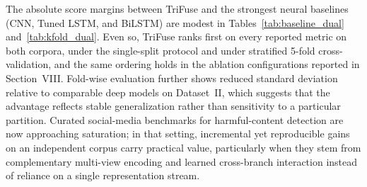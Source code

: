 \begin{table}[!t]
\caption{Stratified 5-Fold Cross-Validation Results (mean\,$\pm$\,std)}
\label{tab:kfold_dual}
\centering
{}
\end{table}

The absolute score margins between TriFuse and the strongest neural baselines (CNN, Tuned LSTM, and BiLSTM) are modest in Tables~\ref{tab:baseline_dual} and~\ref{tab:kfold_dual}. Even so, TriFuse ranks first on every reported metric on both corpora, under the single-split protocol and under stratified 5-fold cross-validation, and the same ordering holds in the ablation configurations reported in Section~VIII. Fold-wise evaluation further shows reduced standard deviation relative to comparable deep models on Dataset~II, which suggests that the advantage reflects stable generalization rather than sensitivity to a particular partition. Curated social-media benchmarks for harmful-content detection are now approaching saturation; in that setting, incremental yet reproducible gains on an independent corpus carry practical value, particularly when they stem from complementary multi-view encoding and learned cross-branch interaction instead of reliance on a single representation stream.

